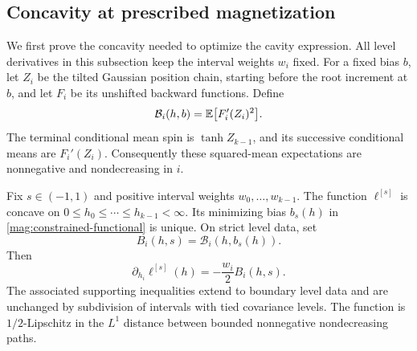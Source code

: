 \subsection{Concavity at prescribed magnetization}

We first prove the concavity needed to optimize the cavity expression.
All level derivatives in this subsection keep the interval weights
$w_i$ fixed. For a fixed bias $b$, let $Z_i$ be the tilted Gaussian
position chain, starting before the root increment at $b$, and let
$F_i$ be its unshifted backward functions. Define
\[
 \mathcal B_i(h,b)=\mathbb E\bigl[F_i'(Z_i)^2\bigr].
\]
The terminal conditional mean spin is $\tanh Z_{k-1}$, and its successive
conditional means are $F_i'(Z_i)$. Consequently these squared-mean
expectations are nonnegative and nondecreasing in $i$.

\begin{proposition}\label{mag:concavity}
Fix $s\in(-1,1)$ and positive interval weights $w_0,\ldots,w_{k-1}$.
The function $\ell^{[s]}$ is concave on
$0\le h_0\le\cdots\le h_{k-1}<\infty$. Its minimizing bias
$b_s(h)$ in \eqref{mag:constrained-functional} is unique. On strict level
data, set
\[
 B_i(h,s)=\mathcal B_i(h,b_s(h)).
\]
Then
\begin{equation}\label{mag:envelope-derivative}
 \partial_{h_i}\ell^{[s]}(h)=-\frac{w_i}{2}B_i(h,s).
\end{equation}
The associated supporting inequalities extend to boundary level data
and are unchanged by subdivision of intervals with tied covariance levels.
The function is $1/2$-Lipschitz in the $L^1$ distance between bounded
nonnegative nondecreasing paths.
\end{proposition}

